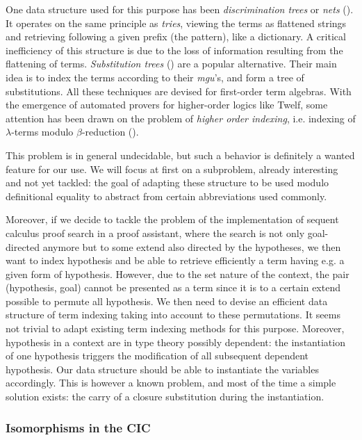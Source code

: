 \documentclass[twoside,a4paper,12pt]{article}
\begin{document}
One data structure used for this purpose has been \emph{discrimination
  trees} or \emph{nets} (\cite{mccune1992experiments}). It operates on
the same principle as \emph{tries}, viewing the terms as flattened
strings and retrieving following a given prefix (the pattern), like a
dictionary. A critical inefficiency of this structure is due to the
loss of information resulting from the flattening of
terms. \emph{Substitution trees} (\cite{graf1995substitution}) are a
popular alternative. Their main idea is to index the terms according
to their \emph{mgu}'s, and form a tree of substitutions. All these
techniques are devised for first-order term algebras. With the
emergence of automated provers for higher-order logics like
\textsf{Twelf}, some attention has been drawn on the problem of
\emph{higher order indexing}, i.e. indexing of $\lambda$-terms modulo
$\beta$-reduction (\cite{pientka2003higher}).

This problem is in general undecidable, but such a behavior is
definitely a wanted feature for our use. We will focus at first on a
subproblem, already interesting and not yet tackled: the goal of
adapting these structure to be used modulo definitional equality to
abstract from certain abbreviations used commonly.

Moreover, if we decide to tackle the problem of the implementation of
sequent calculus proof search in a proof assistant, where the search
is not only goal-directed anymore but to some extend also directed by
the hypotheses, we then want to index hypothesis and be able to
retrieve efficiently a term having e.g. a given form of hypothesis.
However, due to the set nature of the context, the pair (hypothesis,
goal) cannot be presented as a term since it is to a certain extend
possible to permute all hypothesis. We then need to devise an
efficient data structure of term indexing taking into account to these
permutations. It seems not trivial to adapt existing term indexing
methods for this purpose. Moreover, hypothesis in a context are in
type theory possibly dependent: the instantiation of one hypothesis
triggers the modification of all subsequent dependent hypothesis. Our
data structure should be able to instantiate the variables
accordingly. This is however a known problem, and most of the time a
simple solution exists: the carry of a closure substitution during the
instantiation.

\subsubsection{Isomorphisms in the CIC}
\end{document}
